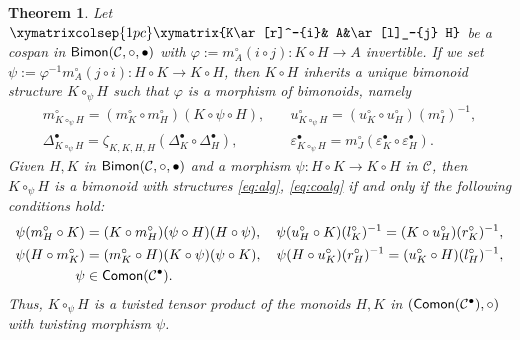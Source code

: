\documentclass[nosumlimits,twoside]{amsart}
\newtheorem{theorem}{\sc Theorem}[section]
\theoremstyle{definition}
\theoremstyle{remark}
\newcommand{\Cc}{\mathcal{C}}
\def\Bimon{{\sf Bimon}}
\def\Comon{{\sf Comon}}
\begin{document}
\begin{theorem}
\label{thm:psi}
Let  $\xymatrixcolsep{1pc}\xymatrix{K\ar[r]^-{i}& A&\ar[l]_-{j} H}$ be  a cospan in $\Bimon (\Cc,\circ,\bullet)$ with $\varphi:= m_A^\circ(i\circ j): K\circ H\to A$ invertible. If we set $\psi:=\varphi^{-1} m_A^\circ(j\circ i):H\circ K \to K\circ H$, then $K\circ H$ inherits a unique bimonoid structure $K\circ_\psi H$ %
  such that $\varphi$ is a morphism of bimonoids, namely
  \begin{align}
 m^\circ_{K\circ_\psi H}=(m^\circ_K\circ m^\circ_H)(K\circ\psi\circ H),&\quad u^\circ_{K\circ_\psi H}=(u_K^\circ\circ u_H^\circ)(m^\circ_I)^{-1}, \label{eq:alg}\\\Delta^\bullet_{K\circ_\psi H}=\zeta_{K,K,H,H} (\Delta^\bullet_K\circ\Delta^\bullet_H) ,&\quad \varepsilon^\bullet_{K\circ_\psi H}=m^\circ_J(\varepsilon^\bullet_K\circ \varepsilon^\bullet_H).\label{eq:coalg}
  \end{align}
Given $H,K$ in $\Bimon (\Cc,\circ,\bullet)$ and a morphism $\psi:H\circ K\to K\circ H$ in $\Cc$, then $K\circ_\psi H$ is a bimonoid with structures \eqref{eq:alg}, \eqref{eq:coalg} if and only if the following conditions hold:
\begin{align}
 \psi(m_H^\circ\circ K)&=(K\circ m_H^\circ)(\psi\circ H)(H\circ \psi),\quad \psi(u_H^\circ\circ K)(l_K^\circ)^{-1}=(K\circ u_H^\circ)(r_K^\circ)^{-1},\label{eq:psi1}\\
 \psi(H\circ m_K^\circ)&=(m_K^\circ\circ H)(K\circ \psi)(\psi\circ K),\quad
 \psi(H\circ u_K^\circ)(r_H^\circ)^{-1}=(u_K^\circ\circ H)(l_H^\circ)^{-1},\label{eq:psi2}\\
\psi&\in \Comon (\mathcal{C}^\bullet)\label{eq:psi3}.
\end{align}
Thus, $K\circ_\psi H$ is a twisted tensor product of the monoids $H,K$ in $(\Comon(\Cc^\bullet),\circ)$ with twisting morphism $\psi$.
\end{theorem}
\end{document}
